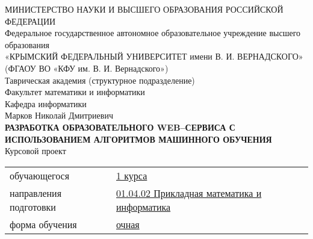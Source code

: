 \begin{center}
\small
МИНИСТЕРСТВО НАУКИ И ВЫСШЕГО ОБРАЗОВАНИЯ РОССИЙСКОЙ ФЕДЕРАЦИИ\\
{\normalsize Федеральное государственное автономное образовательное учреждение высшего образования}\\
«КРЫМСКИЙ ФЕДЕРАЛЬНЫЙ УНИВЕРСИТЕТ имени В. И. ВЕРНАДСКОГО»\\
(ФГАОУ ВО «КФУ им. В. И. Вернадского»)\\
\normalsize
Таврическая академия (структурное подразделение)\\
Факультет математики и информатики\\
Кафедра информатики\\
\vspace*{2\baselineskip}
Марков Николай Дмитриевич\\
\vspace*{1\baselineskip}
\textbf{РАЗРАБОТКА ОБРАЗОВАТЕЛЬНОГО WEB--СЕРВИСА С ИСПОЛЬЗОВАНИЕМ АЛГОРИТМОВ МАШИННОГО ОБУЧЕНИЯ}\\
\vspace*{2\baselineskip}
Курсовой проект\\
\vspace*{1\baselineskip}
\end{center}

 
\begin{tabular}{m{12em} m{10em}}
	обучающегося & \underline{1 курса}\\
	направления подготовки &\underline{01.04.02 Прикладная математика и информатика}\\
	форма обучения &\underline{очная}\\
\end{tabular}\\

